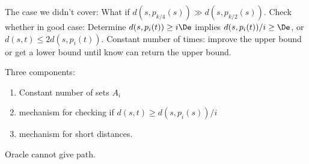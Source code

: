 The case we didn't cover: What if $d(s,p_{k/4}(s))\gg d(s,p_{k/2}(s))$. Check whether in good case: Determine $d(s,p_i(t))\ge i\De$ implies $d(s,p_i(t))/i\ge \De$, or $d(s,t)\le 2d(s,p_i(t))$. Constant number of times: improve the upper bound or get a lower bound until know can return the upper bound.

Three components:
\begin{enumerate}
\item
Constant number of sets $A_i$
\item
mechanism for checking if $d(s,t)\ge d(s,p_i(s))/i$
\item mechanism for short distances.
\end{enumerate}

Oracle cannot give path.
